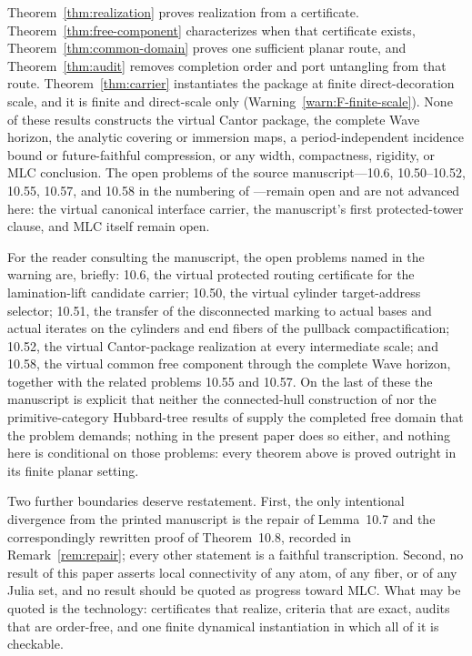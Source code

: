 \begin{warning}\label{warn:F-scope}
Theorem~\ref{thm:realization} proves realization from a certificate.
Theorem~\ref{thm:free-component} characterizes when that certificate
exists, Theorem~\ref{thm:common-domain} proves one sufficient planar
route, and Theorem~\ref{thm:audit} removes completion order and port
untangling from that route.  Theorem~\ref{thm:carrier} instantiates the
package at finite direct-decoration scale, and it is finite and
direct-scale only (Warning~\ref{warn:F-finite-scale}).  None of these
results constructs the virtual Cantor package, the complete Wave
horizon, the analytic covering or immersion maps, a period-independent
incidence bound or future-faithful compression, or any width,
compactness, rigidity, or MLC conclusion.  The
open problems of the source manuscript---10.6, 10.50--10.52, 10.55,
10.57, and 10.58 in the numbering of \cite{MWman}---remain open and are
not advanced here: the virtual canonical interface carrier, the
manuscript's first protected-tower clause, and MLC itself remain open.
\end{warning}

For the reader consulting the manuscript, the open problems named in the
warning are, briefly: 10.6, the virtual protected routing certificate for
the lamination-lift candidate carrier; 10.50, the virtual cylinder
target-address selector; 10.51, the transfer of the disconnected marking
to actual bases and actual iterates on the cylinders and end fibers of
the pullback compactification; 10.52, the virtual Cantor-package
realization at every intermediate scale; and 10.58, the virtual common
free component through the complete Wave horizon, together with the
related problems 10.55 and 10.57.  On the last of these the manuscript is explicit
that neither the connected-hull construction of \cite{Dud25} nor the
primitive-category Hubbard-tree results of \cite{KKL26} supply the
completed free domain that the problem demands; nothing in the present
paper does so either, and nothing here is conditional on those problems:
every theorem above is proved outright in its finite planar setting.

Two further boundaries deserve restatement.  First, the only intentional
divergence from the printed manuscript is the repair of Lemma~10.7 and
the correspondingly rewritten proof of Theorem~10.8, recorded in
Remark~\ref{rem:repair}; every other statement is a faithful
transcription.  Second, no result of this paper asserts local
connectivity of any atom, of any fiber, or of any Julia set, and no
result should be quoted as progress toward MLC.  What may be quoted is
the technology: certificates that realize, criteria that are exact,
audits that are order-free, and one finite dynamical instantiation in
which all of it is checkable.
